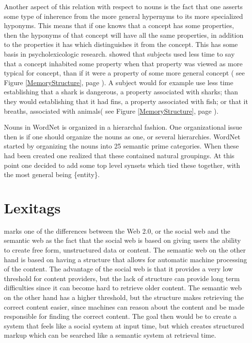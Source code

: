 Another aspect of this relation with respect to nouns is the fact that one asserts some type of inherence from the more
general hypernyms to its more specialized hyponyms.
This means that if one knows that a concept has some properties,
then the hyponyms of that concept will have all the same properties,
in addition to the properties it has which distinguishes it from the concept\citep{Miller1990a}.
This has some basis in psycholexicologic research.
\citet{Collins1969} showed that subjects used less time to say that a concept inhabited some property when that property
was viewed as more typical for concept, than if it were a property of some more general concept
( see Figure \ref{MemoryStructure}, page \pageref{MemoryStructure}).
A subject would for example use less time establishing that a shark is dangerous, a property associated with sharks;
than they would establishing that it had fins, a property associated with fish; or that it breaths, associated with animals( see Figure \ref{MemoryStructure}, page \pageref{MemoryStructure}).

Nouns in WordNet is organized in a hierarchal fashion.
One organizational issue then is if one should organize the nouns as one, or several hierarchies.
WordNet started by organizing the nouns into 25 semantic prime categories.
When these had been created one realized that these contained natural groupings.
At this point one decided to add some top level synsets which tied these together,
with the most general being \{entity\}\citep{Miller1990a}.


\section{Lexitags}
\label{Lexitags}
\citet{Veres2011} marks one of the differences between the Web 2.0, or the social web and the semantic web as the
fact that the social web is based on giving users the ability to create free form, unstructured data or content.
The semantic web on the other hand is based on having a structure that allows for automatic machine processing of the content.
The advantage of the social web is that it provides a very low threshold for content providers,
but the lack of structure can provide long term difficulties since it can become hard to retrieve older content.
The semantic web on the other hand has a higher threshold,
but the structure makes retrieving the correct content easier,
since machines can reason about the content and be made responsible for finding the correct content.
The goal then would be to create a system that feels like a social system at input time,
but which creates structured markup which can be searched like a semantic system at retrieval time.

